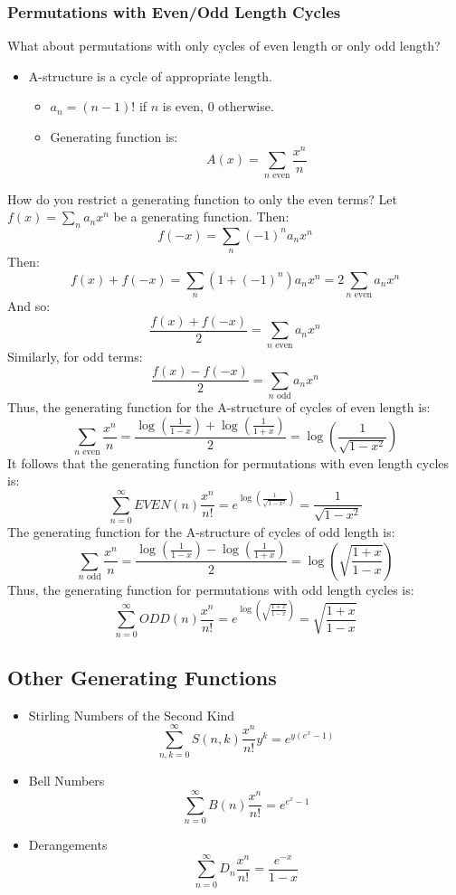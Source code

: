 \documentclass[letterpaper]{article}
\begin{document}
\subsubsection{Permutations with Even/Odd Length Cycles}
What about permutations with only cycles of even length or only odd length? 
\begin{itemize}
    \item A-structure is a cycle of appropriate length.
    \begin{itemize}
        \item $a_n = (n - 1)!$ if $n$ is even, 0 otherwise.
        \item Generating function is:
        \[A(x) = \sum_{n \text{ even}} \frac{x^n}{n}\]
    \end{itemize}
\end{itemize}
How do you restrict a generating function to only the even terms? Let $f(x) = \sum_n a_n x^n$ be a generating function. Then:
\[f(-x) = \sum_{n} (-1)^n a_n x^n\]
Then:
\[f(x) + f(-x) = \sum_n (1 + (-1)^n) a_n x^n = 2 \sum_{n \text{ even}} a_n x^n\]
And so: 
\[\frac{f(x) + f(-x)}{2} = \sum_{n \text{ even}} a_n x^n\]
Similarly, for odd terms: 
\[\frac{f(x) - f(-x)}{2} = \sum_{n \text{ odd}} a_n x^n\]
Thus, the generating function for the A-structure of cycles of even length is:
\[\sum_{n \text{ even}} \frac{x^n}{n} = \frac{\log\left(\frac{1}{1 - x}\right) + \log\left(\frac{1}{1 + x}\right)}{2} = \log\left(\frac{1}{\sqrt{1 - x^2}}\right)\]
It follows that the generating function for permutations with even length cycles is:
\[\boxed{\sum_{n = 0}^{\infty} EVEN(n) \frac{x^n}{n!} = e^{\log\left(\frac{1}{\sqrt{1 - x^2}}\right)} = \frac{1}{\sqrt{1 - x^2}}}\]
The generating function for the A-structure of cycles of odd length is: 
\[\sum_{n \text{ odd}} \frac{x^n}{n} = \frac{\log\left(\frac{1}{1 - x}\right) - \log\left(\frac{1}{1 + x}\right)}{2} = \log\left(\sqrt{\frac{1 + x}{1 - x}}\right)\]
Thus, the generating function for permutations with odd length cycles is:
\[\boxed{\sum_{n = 0}^{\infty} ODD(n) \frac{x^n}{n!} = e^{\log\left(\sqrt{\frac{1 + x}{1 - x}}\right)} = \sqrt{\frac{1 + x}{1 - x}}}\]

\subsection{Other Generating Functions}
\begin{itemize}
    \item Stirling Numbers of the Second Kind
    \[\sum_{n, k = 0}^{\infty} S(n, k) \frac{x^n}{n!} y^k = e^{y(e^x - 1)}\]
    \item Bell Numbers 
    \[\sum_{n = 0}^{\infty} B(n) \frac{x^n}{n!} = e^{e^x - 1}\]
    \item Derangements 
    \[\sum_{n = 0}^{\infty} D_n \frac{x^n}{n!} = \frac{e^{-x}}{1 - x}\]
\end{itemize}
\end{document}
